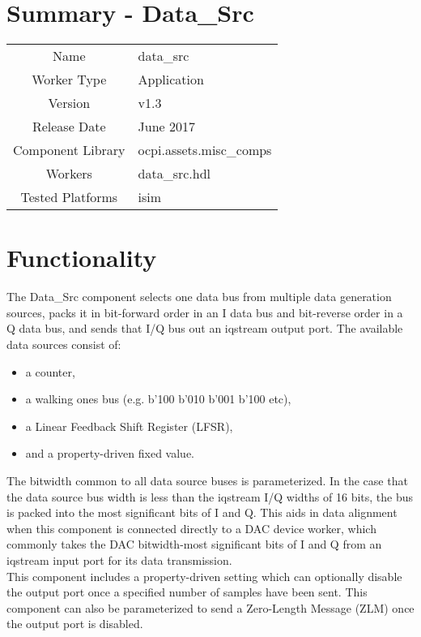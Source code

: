 \documentclass{article}
\author{} %
\date{Version \docVersion} %
\title{\docTitle}
\def\comp{temp}
\def\comp{data\_src}
\def\Comp{TEMP}
\def\Comp{Data\_Src }
\begin{document}
\section*{Summary - \Comp}
\begin{tabular}{|c|M{13.5cm}|}
	\hline
	                  &                                                                                \\
	\hline
	Name              & \comp                                                                          \\
	\hline
	Worker Type       & Application                                                                    \\
	\hline
	Version           &  v1.3                                                                         \\
	\hline
	Release Date      & June 2017 \\
	\hline
	Component Library & ocpi.assets.misc\_comps \\
	\hline
	Workers           & \comp.hdl \\
	\hline
	Tested Platforms  & isim \\
	\hline
\end{tabular}

\section*{Functionality}
\begin{flushleft}
\justify
  The \Comp component selects one data bus from multiple data generation sources, packs it in bit-forward order in an I data bus and bit-reverse order in a Q data bus, and sends that I/Q bus out an iqstream output port. The available data sources consist of:
  \begin{itemize}
  \item a counter,
  \item a walking ones bus (e.g. b'100 \textrightarrow b'010 \textrightarrow b'001 \textrightarrow b'100 \textrightarrow etc),
  \item a Linear Feedback Shift Register (LFSR),
  \item and a property-driven fixed value.
  \end{itemize}
  The bitwidth common to all data source buses is parameterized. In the case that the data source bus width is less than the iqstream I/Q widths of 16 bits, the bus is packed into the most significant bits of I and Q. This aids in data alignment when this component is connected directly to a DAC device worker, which commonly takes the DAC bitwidth-most significant bits of I and Q from an iqstream input port for its data transmission. \\ \medskip
  This component includes a property-driven setting which can optionally disable the output port once a specified number of samples have been sent. This component can also be parameterized to send a Zero-Length Message (ZLM) once the output port is disabled.
\end{flushleft}
\end{document}
